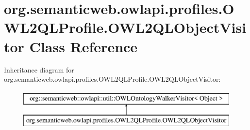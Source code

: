 \hypertarget{classorg_1_1semanticweb_1_1owlapi_1_1profiles_1_1_o_w_l2_q_l_profile_1_1_o_w_l2_q_l_object_visitor}{\section{org.\-semanticweb.\-owlapi.\-profiles.\-O\-W\-L2\-Q\-L\-Profile.\-O\-W\-L2\-Q\-L\-Object\-Visitor Class Reference}
\label{classorg_1_1semanticweb_1_1owlapi_1_1profiles_1_1_o_w_l2_q_l_profile_1_1_o_w_l2_q_l_object_visitor}
}
Inheritance diagram for org.\-semanticweb.\-owlapi.\-profiles.\-O\-W\-L2\-Q\-L\-Profile.\-O\-W\-L2\-Q\-L\-Object\-Visitor\-:\begin{figure}[H]
\begin{center}
\leavevmode
\includegraphics[height=2.000000cm]{classorg_1_1semanticweb_1_1owlapi_1_1profiles_1_1_o_w_l2_q_l_profile_1_1_o_w_l2_q_l_object_visitor}
\end{center}
\end{figure}
